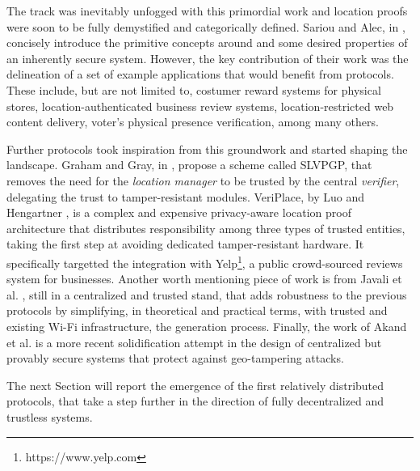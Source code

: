 The \pol{} track was inevitably unfogged with this primordial work and location proofs were soon to be fully demystified and categorically defined. Sariou and Alec, in \cite{saroiu2009enabling}, concisely introduce the primitive concepts around \pol{} and some desired properties of an inherently secure system. However, the key contribution of their work was the delineation of a set of example applications that would benefit from \pol{} protocols. These include, but are not limited to, costumer reward systems for physical stores, location-authenticated business review systems, location-restricted web content delivery, voter's physical presence verification, among many others.

Further protocols took inspiration from this groundwork and started shaping the landscape. Graham and Gray, in \cite{graham2009protecting}, propose a \pol{} scheme called SLVPGP, that removes the need for the \emph{location manager} to be trusted by the central \emph{verifier}, delegating the trust to tamper-resistant modules. VeriPlace, by Luo and Hengartner \cite{luo2010veriplace}, is a complex and expensive privacy-aware location proof architecture that distributes responsibility among three types of trusted entities, taking the first step at avoiding dedicated tamper-resistant hardware. It specifically targetted the integration with Yelp\footnote{https://www.yelp.com}, a public crowd-sourced reviews system for businesses. Another worth mentioning piece of work is from Javali et al. \cite{javali2016alice}, still in a centralized and trusted stand, that adds robustness to the previous protocols by simplifying, in theoretical and practical terms, with trusted and existing Wi-Fi infrastructure, the \pol{} generation process. Finally, the work of Akand et al. \cite{akand2021privacy} is a more recent solidification attempt in the design of centralized but provably secure \pol{} systems that protect against geo-tampering attacks.

The next Section will report the emergence of the first relatively distributed \pol{} protocols, that take a step further in the direction of fully decentralized and trustless systems.